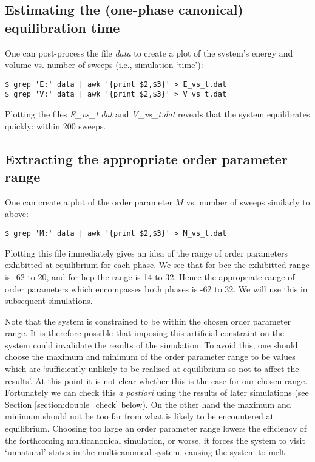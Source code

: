 \documentclass{report}
\begin{document}
\subsection{Estimating the (one-phase canonical) equilibration time}
One can post-process the file \emph{data} to create a plot of the system's energy and volume vs. number of sweeps (i.e., simulation `time'):
\begin{verbatim}
$ grep 'E:' data | awk '{print $2,$3}' > E_vs_t.dat
$ grep 'V:' data | awk '{print $2,$3}' > V_vs_t.dat
\end{verbatim}
Plotting the files \emph{E\_vs\_t.dat} and \emph{V\_vs\_t.dat} reveals that the system equilibrates quickly: within 200 sweeps.

\subsection{Extracting the appropriate order parameter range}
One can create a plot of the order parameter $M$ vs. number of sweeps similarly to above:
\begin{verbatim}
$ grep 'M:' data | awk '{print $2,$3}' > M_vs_t.dat
\end{verbatim}
Plotting this file immediately gives an idea of the range of order parameters exhibitted at equilibrium for each phase. We see that for
bcc the exhibitted range is -62 to 20, and for hcp the range is 14 to 32. Hence the appropriate range of order parameters which encompasses
both phases is -62 to 32. We will use this in subsequent simulations.

Note that the system is constrained to be within the chosen order parameter range. It is therefore possible that imposing this artificial
constraint on the system could invalidate the results of the simulation. To avoid this, one should choose the maximum and minimum of the order
parameter range to be values which are `sufficiently unlikely to be realised at equilibrium so not to affect the results'. At this point it is
not clear whether this is the case for our chosen range. Fortunately we can check this \emph{a postiori} using the results of later simulations 
(see Section \ref{section:double_check} below). On the other hand the maximum and minimum should not be too far from what is likely to be 
encountered at equilibrium. 
Choosing too large an order parameter range lowers the efficiency of the forthcoming multicanonical simulation, or worse, it forces the system to 
visit `unnatural' states in the multicanonical system, causing the system to melt.
\end{document}
